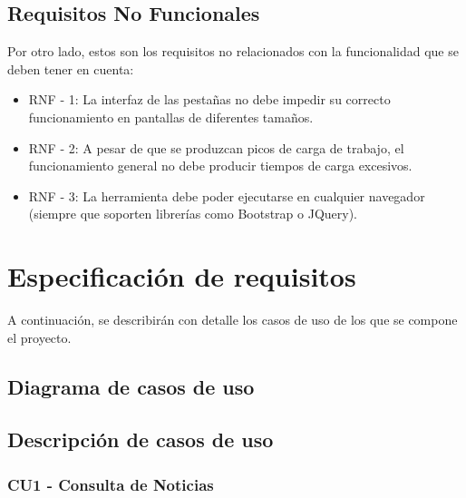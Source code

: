 \subsection{Requisitos No Funcionales}

Por otro lado, estos son los requisitos no relacionados con la funcionalidad que se deben tener en cuenta:

\begin{itemize}

\item RNF - 1: La interfaz de las pestañas no debe impedir su correcto funcionamiento en pantallas de diferentes tamaños.

\item RNF - 2: A pesar de que se produzcan picos de carga de trabajo, el funcionamiento general no debe producir tiempos de carga excesivos.

\item RNF - 3: La herramienta debe poder ejecutarse en cualquier navegador (siempre que soporten librerías como Bootstrap o JQuery).

\end{itemize}

\section{Especificación de requisitos}

A continuación, se describirán con detalle los casos de uso de los que se compone el proyecto.

\subsection{Diagrama de casos de uso}


\subsection{Descripción de casos de uso}

\clearpage
\subsubsection{CU1 - Consulta de Noticias}

